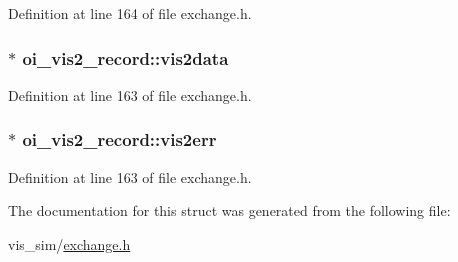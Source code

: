 Definition at line 164 of file exchange.h.

\hypertarget{structoi__vis2__record_a5ede0f7f9e235950bb7c7f2b03cd8209}{
\subsubsection[{vis2data}]{$\ast$ {\bf oi\_\-vis2\_\-record::vis2data}}}
\label{structoi__vis2__record_a5ede0f7f9e235950bb7c7f2b03cd8209}


Definition at line 163 of file exchange.h.

\hypertarget{structoi__vis2__record_a6403351f110c9d2be5c6b0b2270c4c78}{
\subsubsection[{vis2err}]{ $\ast$ {\bf oi\_\-vis2\_\-record::vis2err}}}
\label{structoi__vis2__record_a6403351f110c9d2be5c6b0b2270c4c78}


Definition at line 163 of file exchange.h.



The documentation for this struct was generated from the following file:\begin{DoxyCompactItemize}
\item 
vis\_\-sim/\hyperlink{exchange_8h}{exchange.h}\end{DoxyCompactItemize}
